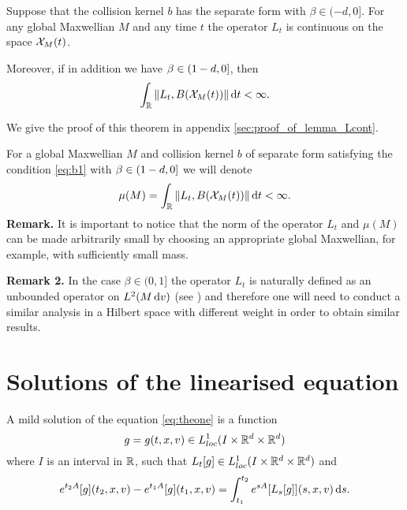 
\begin{theorem}\label{le:L:cont}
	Suppose that the collision kernel $b$ has the separate form with $\beta\in (-d,0]$. For any global Maxwellian $M$ and any time $t$ the operator $L_t$ is continuous on the space ${\mathcal X_M(t)}$.

	Moreover, if in addition we have $\beta\in ( 1-d ,0] $, then
	\[\int_{{\mathbb R}}\|L_t,B({\mathcal X_M(t)})\| {\,\mathrm dt}<\infty.\]
\end{theorem}
\noindent We give the proof of this theorem in appendix \ref{sec:proof_of_lemma_Lcont}.

\noindent For a global Maxwellian $M$ and collision kernel $b$ of separate form satisfying the condition \eqref{eq:b1} with $\beta\in ( 1-d ,0]  $ we will denote \begin{equation}
	\label{eq:mu:def}
	\mu(M) = \int_{{\mathbb R}}\|L_t,B({\mathcal X_M(t)})\| {\,\mathrm dt} <\infty.
\end{equation}
\textbf{Remark.} It is important to notice that the norm of the operator $L_t$ and $\mu(M)$ can be made arbitrarily small by choosing an appropriate global Maxwellian, for example, with sufficiently small mass.

\noindent\textbf{Remark 2.} In the case $\beta\in(0,1]$ the operator $L_t$ is naturally defined as an unbounded operator on $L^2(M{\,\mathrm{d} v})$ (see \cite{Grad:mist}) %
 and therefore one will need to conduct a similar analysis in a Hilbert space with different weight in order to obtain similar results.





\section{Solutions of the linearised equation} %
\label{sec:solutions_of_the_linearised_equation}


\begin{definition} A mild solution of the equation \eqref{eq:theone} is a function \[g=g(t,x,v) \in L^1_{loc} (I\times {\mathbb R^d}\times {\mathbb R^d})\] where $I$ is an interval in ${\mathbb R}$,  such that $L_t[g]\in L^1_{loc} (I\times {{\mathbb R^d}\times{\mathbb R^d}} ) $
and
\[e^{t_2A}[g](t_2,x,v)-e^{t_1A}[g](t_1,x,v)=\int_{t_1}^{t_2}e^{sA}[L_s[g]](s,x,v){\,\mathrm ds}.\]

\end{definition}
